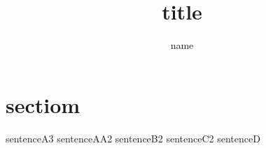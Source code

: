 \documentclass{jarticle}
\title{title}
\author{name}
\begin{document}
\maketitle
\section{sectiom}
sentenceA3
sentenceAA2
sentenceB2
sentenceC2
sentenceD
\end{document}
